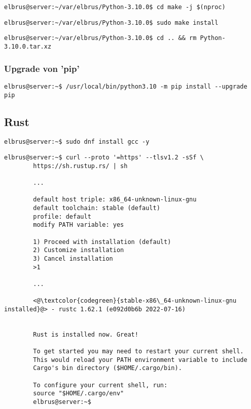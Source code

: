 \documentclass{article}
\begin{document}
	\begin{lstlisting}[caption={Starten des build Prozesses.}]
		elbrus@server:~/var/elbrus/Python-3.10.0$ cd make -j $(nproc)
	\end{lstlisting}
	
	\begin{lstlisting}[caption={Installieren von Python.}]
		elbrus@server:~/var/elbrus/Python-3.10.0$ sudo make install
	\end{lstlisting}

	\begin{lstlisting}[caption={Löschen der kompremierten Python Datei.}]
		elbrus@server:~/var/elbrus/Python-3.10.0$ cd .. && rm Python-3.10.0.tar.xz
	\end{lstlisting}

	
	\subsubsection{Upgrade von 'pip'}
	\begin{lstlisting}[caption={Upgraden von 'pip'.}]
		elbrus@server:~$ /usr/local/bin/python3.10 -m pip install --upgrade pip
	\end{lstlisting}

	\subsection{Rust}
	
	\begin{lstlisting}[caption={Installieren von GNU Compiler Collection.}]
		elbrus@server:~$ sudo dnf install gcc -y
	\end{lstlisting}
	
	\lstset{style=commands}
	\begin{lstlisting}[caption={Installieren von Rust.}]
		elbrus@server:~$ curl --proto '=https' --tlsv1.2 -sSf \
		https://sh.rustup.rs/ | sh
		 
		...
		 
		default host triple: x86_64-unknown-linux-gnu
		default toolchain: stable (default)
		profile: default
		modify PATH variable: yes
		
		1) Proceed with installation (default)
		2) Customize installation
		3) Cancel installation
		>1
		
		...
		
		<@\textcolor{codegreen}{stable-x86\_64-unknown-linux-gnu installed}@> - rustc 1.62.1 (e092d0b6b 2022-07-16)
		
		
		Rust is installed now. Great!
		
		To get started you may need to restart your current shell.
		This would reload your PATH environment variable to include
		Cargo's bin directory ($HOME/.cargo/bin).
		
		To configure your current shell, run:
		source "$HOME/.cargo/env"
		elbrus@server:~$
	\end{lstlisting}
	
\end{document}
